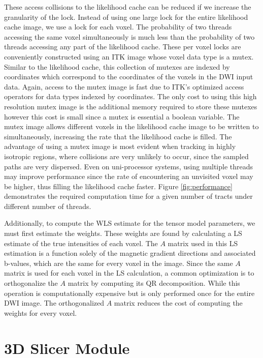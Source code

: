 These access collisions to the likelihood cache can be reduced if we increase the granularity of the lock.  Instead of using one large lock for the entire likelihood cache image, we use a lock for each voxel.  The probability of two threads accessing the same voxel simultaneously is much less than the probability of two threads accessing any part of the likelihood cache.  These per voxel locks are conveniently constructed using an ITK image whose voxel data type is a mutex.  Similar to the likelihood cache, this collection of mutexes are indexed by coordinates which correspond to the coordinates of the voxels in the DWI input data.  Again, access to the mutex image is fast due to ITK's optimized access operators for data types indexed by coordinates.  The only cost to using this high resolution mutex image is the additional memory required to store these mutexes however this cost is small since a mutex is essential a boolean variable.  The mutex image allows different voxels in the likelihood cache image to be written to simultaneously, increasing the rate that the likelihood cache is filled.  The advantage of using a mutex image is most evident when tracking in highly isotropic regions,  where collisions are very unlikely to occur, since the sampled paths are very dispersed.  Even on uni-processor systems, using multiple threads may improve performance since the rate of encountering an unvisited voxel may be higher, thus filling the likelihood cache faster. Figure \ref{fig:performance} demonstrates the required computation time for a given number of tracts under different number of threads.

Additionally, to compute the WLS estimate for the tensor model parameters, we must first estimate the weights.  These weights are found by calculating a LS estimate of the true intensities of each voxel.  The $A$ matrix used in this LS estimation is a function solely of the magnetic gradient directions and associated b-values, which are the same for every voxel in the image.  Since the same $A$ matrix is used for each voxel in the LS calculation, a common optimization is to orthogonalize the $A$ matrix by computing its QR decomposition.  While this operation is computationally expensive but is only performed once for the entire DWI image.  The orthogonalized $A$ matrix reduces the cost of computing the weights for every voxel.

	

\section{3D Slicer Module}
